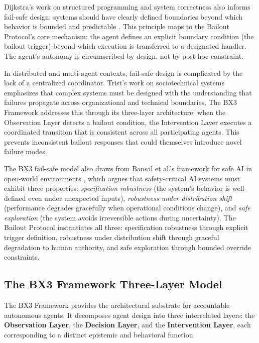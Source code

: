 Dijkstra's work on structured programming and system correctness also informs fail-safe design: systems should have clearly defined boundaries beyond which behavior is bounded and predictable \cite{dijkstra1982}. This principle maps to the Bailout Protocol's core mechanism: the agent defines an explicit boundary condition (the bailout trigger) beyond which execution is transferred to a designated handler. The agent's autonomy is circumscribed by design, not by post-hoc constraint.

In distributed and multi-agent contexts, fail-safe design is complicated by the lack of a centralized coordinator. Trist's work on sociotechnical systems \cite{tristr81} emphasizes that complex systems must be designed with the understanding that failures propagate across organizational and technical boundaries. The BX3 Framework addresses this through its three-layer architecture: when the Observation Layer detects a bailout condition, the Intervention Layer executes a coordinated transition that is consistent across all participating agents. This prevents inconsistent bailout responses that could themselves introduce novel failure modes.

The BX3 fail-safe model also draws from Bansal et al.'s framework for safe AI in open-world environments \cite{bansal2019}, which argues that safety-critical AI systems must exhibit three properties: \textit{specification robustness} (the system's behavior is well-defined even under unexpected inputs), \textit{robustness under distribution shift} (performance degrades gracefully when operational conditions change), and \textit{safe exploration} (the system avoids irreversible actions during uncertainty). The Bailout Protocol instantiates all three: specification robustness through explicit trigger definition, robustness under distribution shift through graceful degradation to human authority, and safe exploration through bounded override constraints.

\subsection{The BX3 Framework Three-Layer Model}

The BX3 Framework provides the architectural substrate for accountable autonomous agents. It decomposes agent design into three interrelated layers: the \textbf{Observation Layer}, the \textbf{Decision Layer}, and the \textbf{Intervention Layer}, each corresponding to a distinct epistemic and behavioral function.

